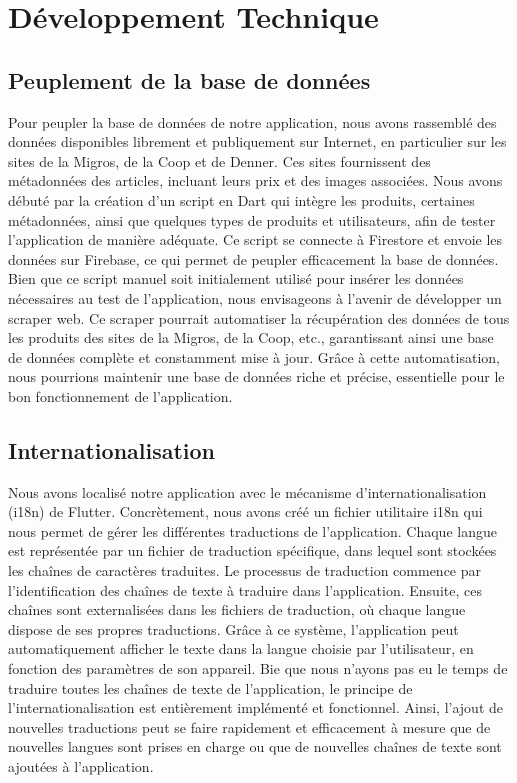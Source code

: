 
\section{Développement Technique}

\subsection{Peuplement de la base de données}

Pour peupler la base de données de notre application, nous avons rassemblé des données disponibles librement et publiquement sur Internet, en particulier sur les sites de la Migros, de la Coop et de Denner. Ces sites fournissent des métadonnées des articles, incluant leurs prix et des images associées. Nous avons débuté par la création d'un script en Dart qui intègre les produits, certaines métadonnées, ainsi que quelques types de produits et utilisateurs, afin de tester l'application de manière adéquate. Ce script se connecte à Firestore et envoie les données sur Firebase, ce qui permet de peupler efficacement la base de données. Bien que ce script manuel soit initialement utilisé pour insérer les données nécessaires au test de l'application, nous envisageons à l'avenir de développer un scraper web. Ce scraper pourrait automatiser la récupération des données de tous les produits des sites de la Migros, de la Coop, etc., garantissant ainsi une base de données complète et constamment mise à jour. Grâce à cette automatisation, nous pourrions maintenir une base de données riche et précise, essentielle pour le bon fonctionnement de l'application.

\subsection{Internationalisation}
\label{sec:i18n}

Nous avons localisé notre application avec le mécanisme d'internationalisation (i18n) de Flutter. Concrètement, nous avons créé un fichier utilitaire i18n qui nous permet de gérer les différentes traductions de l'application. Chaque langue est représentée par un fichier de traduction spécifique, dans lequel sont stockées les chaînes de caractères traduites. Le processus de traduction commence par l'identification des chaînes de texte à traduire dans l'application. Ensuite, ces chaînes sont externalisées dans les fichiers de traduction, où chaque langue dispose de ses propres traductions. Grâce à ce système, l'application peut automatiquement afficher le texte dans la langue choisie par l'utilisateur, en fonction des paramètres de son appareil. Bie que nous n'ayons pas eu le temps de traduire toutes les chaînes de texte de l'application, le principe de l'internationalisation est entièrement implémenté et fonctionnel. Ainsi, l'ajout de nouvelles traductions peut se faire rapidement et efficacement à mesure que de nouvelles langues sont prises en charge ou que de nouvelles chaînes de texte sont ajoutées à l'application.

